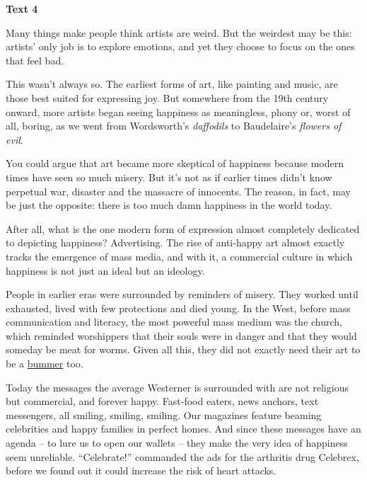 
\begin{center}\textbf{Text 4}\end{center}

\qquad Many things make people think artists are weird. But the weirdest may be this: artists' only job is to explore emotions, and yet they choose to focus on the ones that feel bad.

\qquad This wasn't always so. The earliest forms of art, like painting and music, are those best suited for expressing joy. But somewhere from the 19th century onward, more artists began seeing happiness as meaningless, phony or, worst of all, boring, as we went from Wordsworth's \emph{daffodils} to Baudelaire's \emph{flowers of evil}.

\qquad You could argue that art became more skeptical of happiness because modern times have seen so much misery. But it's not as if earlier times didn't know perpetual war, disaster and the massacre of innocents. The reason, in fact, may be just the opposite: there is too much damn happiness in the world today.

\qquad After all, what is the one modern form of expression almost completely dedicated to depicting happiness? Advertising. The rise of anti-happy art almost exactly tracks the emergence of mass media, and with it, a commercial culture in which happiness is not just an ideal but an ideology.

\qquad People in earlier eras were surrounded by reminders of misery. They worked until exhausted, lived with few protections and died young. In the West, before mass communication and literacy, the most powerful mass medium was the church, which reminded worshippers that their souls were in danger and that they would someday be meat for worms. Given all this, they did not exactly need their art to be a \ul{bummer} too.

\qquad Today the messages the average Westerner is surrounded with are not religious but commercial, and forever happy. Fast-food eaters, news anchors, text messengers, all smiling, smiling, smiling. Our magazines feature beaming celebrities and happy families in perfect homes. And since these messages have an agenda -- to lure us to open our wallets -- they make the very idea of happiness seem unreliable. ``Celebrate!'' commanded the ads for the arthritis drug Celebrex, before we found out it could increase the risk of heart attacks.

